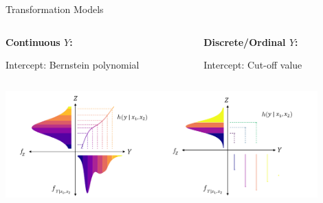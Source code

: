 \documentclass[onlytextwidth,english]{beamer}\usepackage[]{graphicx}\usepackage[]{xcolor}
\begin{document}
\begin{frame}{Transformation Models}

\begin{columns}

\begin{column}{0.48\textwidth}
\textbf{Continuous $Y$:}

{\small
\vspace{0.2cm}
Intercept: Bernstein polynomial
\vspace{0.2cm}


\vspace{0.2cm}

}

\end{column}

\begin{column}{0.48\textwidth}
\textbf{Discrete/Ordinal $Y$:}

{\small

\vspace{0.2cm}
Intercept: Cut-off value
\vspace{0.2cm}


\vspace{0.2cm}

}

\end{column}

\end{columns}

\vspace{0.3cm}
\centering
\includegraphics[width=0.9\textwidth]{img/TRAM_Cont_Ord.png}

\end{frame}
\end{document}
